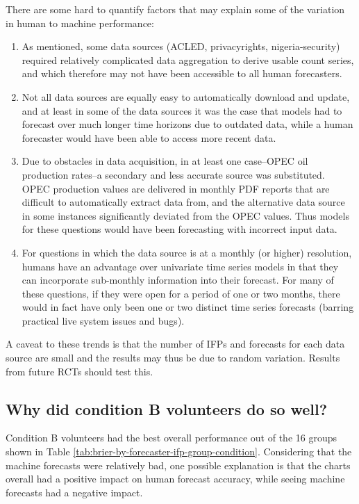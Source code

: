 \documentclass[]{article}
\providecommand{\tightlist}{%
  \setlength{\itemsep}{0pt}\setlength{\parskip}{0pt}}
\begin{document}
There are some hard to quantify factors that may explain some of the
variation in human to machine performance:

\begin{enumerate}
\def\labelenumi{\arabic{enumi}.}
\tightlist
\item
  As mentioned, some data sources (ACLED, privacyrights,
  nigeria-security) required relatively complicated data aggregation to
  derive usable count series, and which therefore may not have been
  accessible to all human forecasters.
\item
  Not all data sources are equally easy to automatically download and
  update, and at least in some of the data sources it was the case that
  models had to forecast over much longer time horizons due to outdated
  data, while a human forecaster would have been able to access more
  recent data.
\item
  Due to obstacles in data acquisition, in at least one case--OPEC oil
  production rates--a secondary and less accurate source was
  substituted. OPEC production values are delivered in monthly PDF
  reports that are difficult to automatically extract data from, and the
  alternative data source in some instances significantly deviated from
  the OPEC values. Thus models for these questions would have been
  forecasting with incorrect input data.
\item
  For questions in which the data source is at a monthly (or higher)
  resolution, humans have an advantage over univariate time series
  models in that they can incorporate sub-monthly information into their
  forecast. For many of these questions, if they were open for a period
  of one or two months, there would in fact have only been one or two
  distinct time series forecasts (barring practical live system issues
  and bugs).
\end{enumerate}

A caveat to these trends is that the number of IFPs and forecasts for
each data source are small and the results may thus be due to random
variation. Results from future RCTs should test this.

\subsection{Why did condition B volunteers do so
well?}\label{why-did-condition-b-volunteers-do-so-well}

Condition B volunteers had the best overall performance out of the 16
groups shown in Table \ref{tab:brier-by-forecaster-ifp-group-condition}.
Considering that the machine forecasts were relatively bad, one possible
explanation is that the charts overall had a positive impact on human
forecast accuracy, while seeing machine forecasts had a negative impact.
\end{document}

